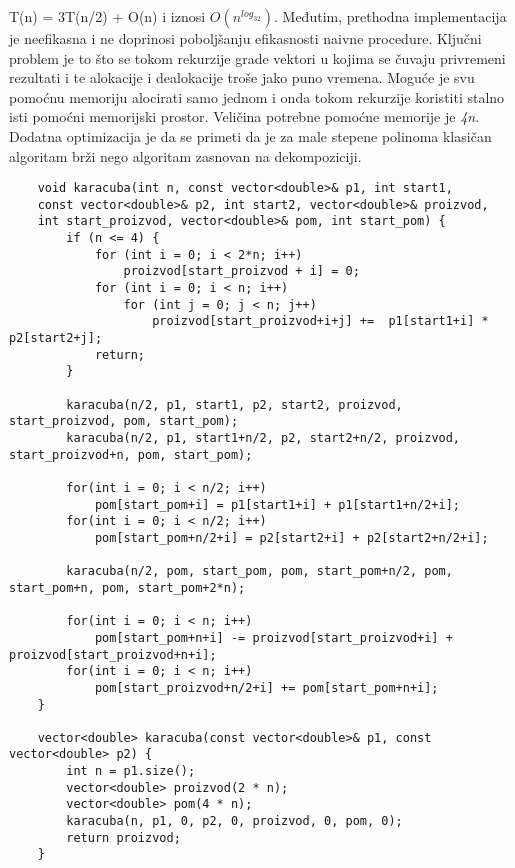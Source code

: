 \documentclass{article}
\begin{document}
T(n) = 3T(n/2) + O(n) i iznosi $O(n^{log_32})$.
\newline
Međutim, prethodna implementacija je neefikasna i ne
doprinosi poboljšanju efikasnosti naivne procedure. Ključni problem je to što
se tokom rekurzije grade vektori u kojima se čuvaju privremeni rezultati i te
alokacije i dealokacije troše jako puno vremena. Moguće je svu pomoćnu memoriju alocirati samo jednom i onda tokom rekurzije
koristiti stalno isti pomoćni memorijski prostor. Veličina potrebne pomoćne
memorije je \textit{4n}. Dodatna optimizacija je da se primeti da je
za male stepene polinoma klasičan algoritam brži nego algoritam zasnovan na
dekompoziciji.
\begin{lstlisting}
    void karacuba(int n, const vector<double>& p1, int start1,
    const vector<double>& p2, int start2, vector<double>& proizvod, 
    int start_proizvod, vector<double>& pom, int start_pom) {
        if (n <= 4) {
            for (int i = 0; i < 2*n; i++)
                proizvod[start_proizvod + i] = 0;
            for (int i = 0; i < n; i++)
                for (int j = 0; j < n; j++)
                    proizvod[start_proizvod+i+j] +=  p1[start1+i] * p2[start2+j];
            return;
        }
        
        karacuba(n/2, p1, start1, p2, start2, proizvod, start_proizvod, pom, start_pom);
        karacuba(n/2, p1, start1+n/2, p2, start2+n/2, proizvod, start_proizvod+n, pom, start_pom);
        
        for(int i = 0; i < n/2; i++)
            pom[start_pom+i] = p1[start1+i] + p1[start1+n/2+i];
        for(int i = 0; i < n/2; i++)
            pom[start_pom+n/2+i] = p2[start2+i] + p2[start2+n/2+i];
        
        karacuba(n/2, pom, start_pom, pom, start_pom+n/2, pom, start_pom+n, pom, start_pom+2*n);
        
        for(int i = 0; i < n; i++)
            pom[start_pom+n+i] -= proizvod[start_proizvod+i] + proizvod[start_proizvod+n+i];
        for(int i = 0; i < n; i++)
            pom[start_proizvod+n/2+i] += pom[start_pom+n+i];
    }
    
    vector<double> karacuba(const vector<double>& p1, const vector<double> p2) {
        int n = p1.size();
        vector<double> proizvod(2 * n);
        vector<double> pom(4 * n);
        karacuba(n, p1, 0, p2, 0, proizvod, 0, pom, 0);
        return proizvod;
    }
\end{lstlisting}
\end{document}
